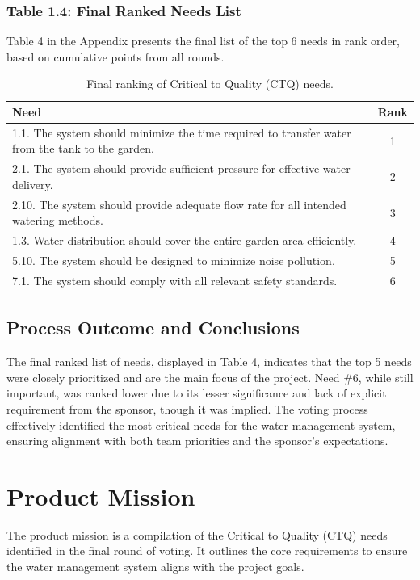 \documentclass[12pt]{report}
\begin{document}
\subsubsection{Table 1.4: Final Ranked Needs List}
Table 4 in the Appendix presents the final list of the top 6 needs in rank order, based on cumulative points from all rounds.

\begin{table}[H]
\centering
\caption{Final ranking of Critical to Quality (CTQ) needs.}
\begin{tabular}{|p{12cm}|c|}
\hline
\textbf{Need} & \textbf{Rank} \\
\hline
1.1. The system should minimize the time required to transfer water from the tank to the garden. & 1 \\
2.1. The system should provide sufficient pressure for effective water delivery. & 2 \\
2.10. The system should provide adequate flow rate for all intended watering methods. & 3 \\
1.3. Water distribution should cover the entire garden area efficiently. & 4 \\
5.10. The system should be designed to minimize noise pollution. & 5 \\
7.1. The system should comply with all relevant safety standards. & 6 \\
\hline
\end{tabular}
\end{table}

\subsection{Process Outcome and Conclusions}

The final ranked list of needs, displayed in Table 4, indicates that the top 5 needs were closely prioritized and are the main focus of the project. Need \#6, while still important, was ranked lower due to its lesser significance and lack of explicit requirement from the sponsor, though it was implied. The voting process effectively identified the most critical needs for the water management system, ensuring alignment with both team priorities and the sponsor's expectations.

\section{Product Mission}
The product mission is a compilation of the Critical to Quality (CTQ) needs identified in the final round of voting. It outlines the core requirements to ensure the water management system aligns with the project goals.
\end{document}
